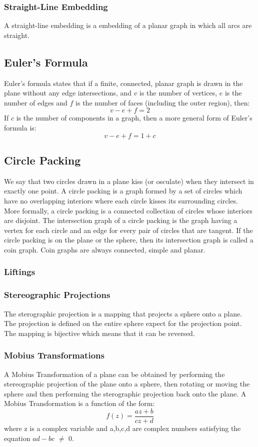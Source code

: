 \documentclass{article}
\begin{document}
\subsubsection{Straight-Line Embedding}
A straight-line embedding is a embedding of a planar graph in which all arcs are straight.
\subsection{Euler's Formula}
Euler's formula states that if a finite, connected, planar graph is drawn in the plane without any edge intersections, and $v$ is the number of vertices, $e$ is the number of edges and $f$ is the number of faces (including the outer region), then: 
\begin{equation} 
v-e+f=2
\end{equation}
If $c$ is the number of components in a graph, then a more general form of Euler's formula is:
\begin{equation} 
v-e+f= 1 + c
\end{equation}
\subsection{Circle Packing}
We say that two circles drawn in a plane kiss (or osculate) when they intersect in exactly one point. A circle packing is a graph formed by a set of circles which have no overlapping interiors where each circle kisses its surrounding circles. More formally, a circle packing is a connected collection of circles whose interiors are disjoint. The intersection graph of a circle packing is the graph having a vertex for each circle and an edge for every pair of circles that are tangent. If the circle packing is on the plane or the sphere, then its intersection graph is called a coin graph. Coin graphs are always connected, simple and planar. \subsubsection{Liftings}
\subsubsection{Stereographic Projections}
The sterographic projection is a mapping that projects a sphere onto a plane. The projection is defined on the entire sphere expect for the projection point. The mapping is bijective which means that it can be reversed.
\subsubsection{Mobius Transformations}
A Mobius Transformation of a plane can be obtained by performing the stereographic projection of the plane onto a sphere, then rotating or moving the sphere and then performing the sterographic projection back onto the plane. A Mobius Transformation is a function of the form:
\begin{equation} 
f(z) = \frac{az+b}{cz+d}
\end{equation}
where z is a complex variable and a,b,c,d are complex numbers satisfying the equation $ad - bc$ $\neq$ $0$.
\end{document}
